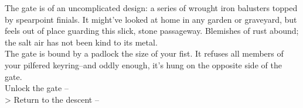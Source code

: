 The gate is of an uncomplicated design: a series of wrought iron balusters topped by spearpoint finials. It might've looked at home in any garden or graveyard, but feels out of place guarding this slick, stone passageway. Blemishes of rust abound; the salt air has not been kind to its metal.\\

The gate is bound by a padlock the size of your fist. It refuses all members of your pilfered keyring--and oddly enough, it’s hung on the opposite side of the gate.\\

 Unlock the gate -- \\
> Return to the descent -- 